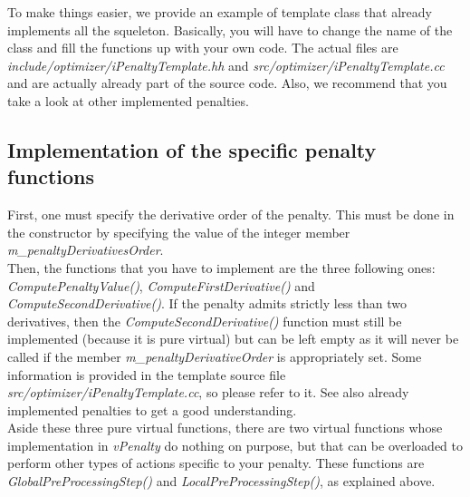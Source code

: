 \documentclass[a4paper, 11pt]{article}
\begin{document}
To make things easier, we provide an example of template class that already implements all the squeleton.
Basically, you will have to change the name of the class and fill the functions up with your own code.
The actual files are \textit{include/optimizer/iPenaltyTemplate.hh} and \textit{src/optimizer/iPenaltyTemplate.cc} and are actually already part of the source code.
Also, we recommend that you take a look at other implemented penalties.

\subsection{Implementation of the specific penalty functions}

First, one must specify the derivative order of the penalty.
This must be done in the constructor by specifying the value of the integer member \textit{m\_penaltyDerivativesOrder}.\\

Then, the functions that you have to implement are the three following ones: \textit{ComputePenaltyValue()}, \textit{ComputeFirstDerivative()} and \textit{ComputeSecondDerivative()}.
If the penalty admits strictly less than two derivatives, then the \textit{ComputeSecondDerivative()} function must still be implemented (because it is pure virtual) but can be left empty as it will never be called if the member \textit{m\_penaltyDerivativeOrder} is appropriately set.
Some information is provided in the template source file \textit{src/optimizer/iPenaltyTemplate.cc}, so please refer to it.
See also already implemented penalties to get a good understanding.\\

Aside these three pure virtual functions, there are two virtual functions whose implementation in \textit{vPenalty} do nothing on purpose, but that can be overloaded to perform other types of actions specific to your penalty.
These functions are \textit{GlobalPreProcessingStep()} and \textit{LocalPreProcessingStep()}, as explained above.
\end{document}

